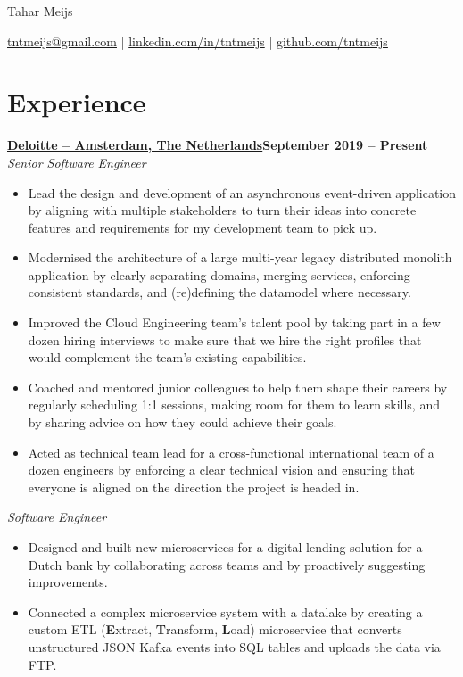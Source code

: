 \documentclass[11pt]{article}       %
\begin{document}
\centerline{\Huge Tahar Meijs}

\vspace{5pt}

\centerline{\href{mailto:tntmeijs@gmail.com}{tntmeijs@gmail.com} | \href{https://www.linkedin.com/in/tntmeijs/}{linkedin.com/in/tntmeijs} | \href{https://github.com/tntmeijs}{github.com/tntmeijs}}

\section*{Experience}
\textbf{\href{https://www.deloitte.com/nl/nl.html}{Deloitte -- Amsterdam, The Netherlands}\hfill September 2019 -- Present} \\
\textit{Senior Software Engineer} \\
\vspace{-9pt}
\begin{itemize}
  \item Lead the design and development of an asynchronous event-driven application by aligning with multiple stakeholders to turn their ideas into concrete features and requirements for my development team to pick up.
  \item Modernised the architecture of a large multi-year legacy distributed monolith application by clearly separating domains, merging services, enforcing consistent standards, and (re)defining the datamodel where necessary.
  \item Improved the Cloud Engineering team's talent pool by taking part in a few dozen hiring interviews to make sure that we hire the right profiles that would complement the team's existing capabilities.
  \item Coached and mentored junior colleagues to help them shape their careers by regularly scheduling 1:1 sessions, making room for them to learn skills, and by sharing advice on how they could achieve their goals.
  \item Acted as technical team lead for a cross-functional international team of a dozen engineers by enforcing a clear technical vision and ensuring that everyone is aligned on the direction the project is headed in.
\end{itemize}

\textit{Software Engineer} \\
\vspace{-9pt}
\begin{itemize}
  \item Designed and built new microservices for a digital lending solution for a Dutch bank by collaborating across teams and by proactively suggesting improvements.
  \item Connected a complex microservice system with a datalake by creating a custom ETL (\textbf{E}xtract, \textbf{T}ransform, \textbf{L}oad) microservice that converts unstructured JSON Kafka events into SQL tables and uploads the data via FTP.
\end{itemize}
\end{document}
